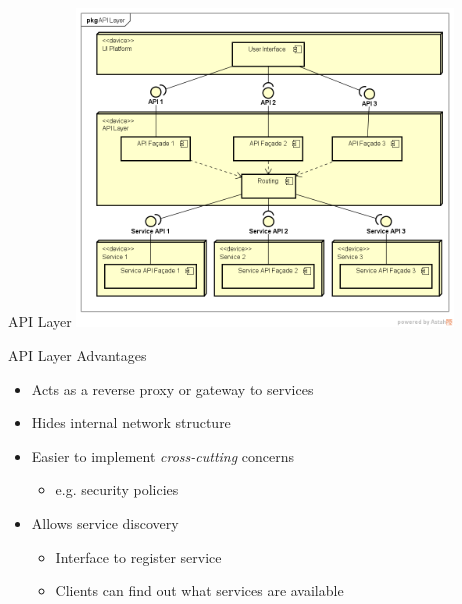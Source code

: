 \documentclass{slide}
\begin{document}
\begin{frame}{API Layer}
    \centering
    \includegraphics[trim=39 37 21 42,clip,width=0.75\textwidth]{../../notes/service-based/diagrams/api-layer.png}
\end{frame}

\begin{frame}{API Layer Advantages}
    \vspace{1mm}
    {\LARGE
    \begin{itemize}
        \item Acts as a reverse proxy or gateway to services
        \vspace{2mm}
        \item Hides internal network structure
        \vspace{4mm}
        \item Easier to implement \emph{cross-cutting} concerns
        \begin{itemize}
            \Large\item e.g. security policies
        \end{itemize}
        \vspace{2mm}
        \item Allows service discovery
        \begin{itemize}
            \Large\item Interface to register service
            \Large\item Clients can find out what services are available
        \end{itemize}
    \end{itemize}
    }
\end{frame}
\end{document}
